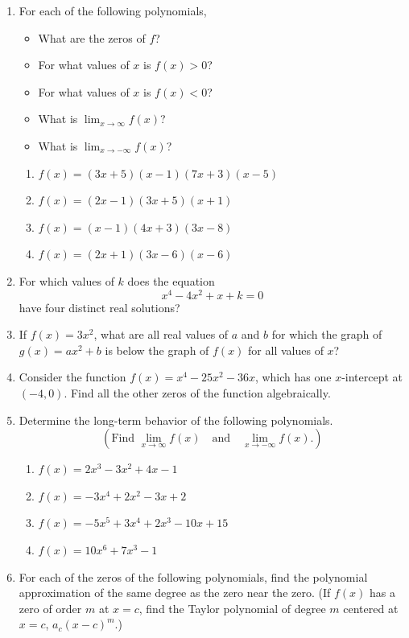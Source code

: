 \documentclass[
]{book}
\providecommand{\tightlist}{%
  \setlength{\itemsep}{0pt}\setlength{\parskip}{0pt}}
\theoremstyle{definition}
\theoremstyle{definition}
\theoremstyle{definition}
\theoremstyle{remark}
\begin{document}
\begin{enumerate}
\def\labelenumi{\arabic{enumi}.}
\item
  For each of the following polynomials,

  \begin{itemize}
  \tightlist
  \item
    What are the zeros of \(f\)?
  \item
    For what values of \(x\) is \(f(x)>0\)?
  \item
    For what values of \(x\) is \(f(x)<0\)?
  \item
    What is \({\displaystyle \lim_{x\rightarrow \infty} f(x)}\)?
  \item
    What is \({\displaystyle \lim_{x\rightarrow -\infty} f(x)}\)?
  \end{itemize}

  \begin{enumerate}
  \def\labelenumii{\alph{enumii}.}
  \tightlist
  \item
    \({\displaystyle f(x)=(3x+5)(x-1)(7x+3)(x-5)}\)
  \item
    \({\displaystyle f(x)=(2x-1)(3x+5)(x+1)}\)
  \item
    \({\displaystyle f(x)=(x-1)(4x+3)(3x-8)}\)
  \item
    \({\displaystyle f(x)=(2x+1)(3x-6)(x-6)}\)
  \end{enumerate}
\item
  For which values of \(k\) does the equation \[x^4-4x^2+x+k=0\] have four distinct real solutions?
\item
  If \(f(x)=3x^2\), what are all real values of \(a\) and \(b\) for which the graph of \(g(x)=ax^2+b\) is below the graph of \(f(x)\) for all values of \(x\)?
\item
  Consider the function \(f(x)=x^4-25x^2-36x\), which has one \(x\)-intercept at \((-4,0)\). Find all the other zeros of the function algebraically.
\item
  Determine the long-term behavior of the following polynomials.
  \[\left(\mbox{Find } \lim_{x\rightarrow \infty} f(x) \quad \mbox{and} \quad \lim_{x\rightarrow -\infty} f(x). \right)\]

  \begin{enumerate}
  \def\labelenumii{\alph{enumii}.}
  \tightlist
  \item
    \({\displaystyle f(x)=2x^3-3x^2+4x-1}\)
  \item
    \({\displaystyle f(x)=-3x^4+2x^2-3x+2}\)
  \item
    \({\displaystyle f(x)=-5x^5+3x^4+2x^3-10x+15}\)
  \item
    \({\displaystyle f(x)=10x^6+7x^3-1}\)
  \end{enumerate}
\item
  For each of the zeros of the following polynomials, find the polynomial approximation of the same degree as the zero near the zero. (If \(f(x)\) has a zero of order \(m\) at \(x=c\), find the Taylor polynomial of degree \(m\) centered at \(x=c\), \(a_c (x-c)^m\).)


\end{enumerate}
\end{document}
